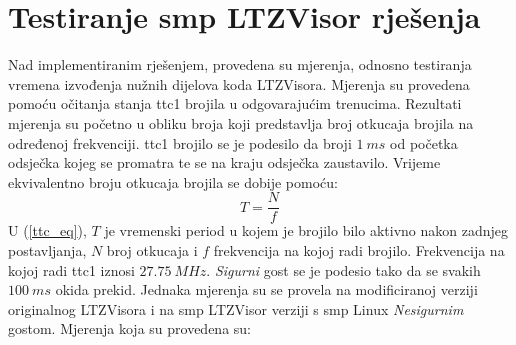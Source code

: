 \documentclass[times, utf8, diplomski, numeric]{fer}
\begin{document}
\chapter{Testiranje \gls{smp} LTZVisor rješenja}
Nad implementiranim rješenjem, provedena su mjerenja, odnosno testiranja vremena izvođenja nužnih dijelova koda LTZVisora.
Mjerenja su provedena pomoću očitanja stanja \gls{ttc}1 brojila u odgovarajućim trenucima. Rezultati mjerenja su početno u obliku
broja koji predstavlja broj otkucaja brojila na određenoj frekvenciji. \gls{ttc}1 brojilo se je podesilo da broji $1~ms$ od
početka odsječka kojeg se promatra te se na kraju odsječka zaustavilo. Vrijeme ekvivalentno broju otkucaja brojila se dobije
pomoću:
\begin{equation}
  \label{ttc_eq}
  T=\frac{N}{f}
\end{equation}
U (\ref{ttc_eq}), $T$ je vremenski period u kojem je brojilo bilo aktivno nakon zadnjeg postavljanja, $N$ broj otkucaja
i $f$ frekvencija na kojoj radi brojilo. Frekvencija na kojoj radi \gls{ttc}1 iznosi $27.75~MHz$. \textit{Sigurni} gost se je
podesio tako da se svakih $100~ms$ okida prekid. Jednaka mjerenja su se provela na modificiranoj verziji originalnog
LTZVisora i na \gls{smp} LTZVisor verziji s \gls{smp} Linux \textit{Nesigurnim}
gostom. Mjerenja koja su provedena su:
\end{document}
